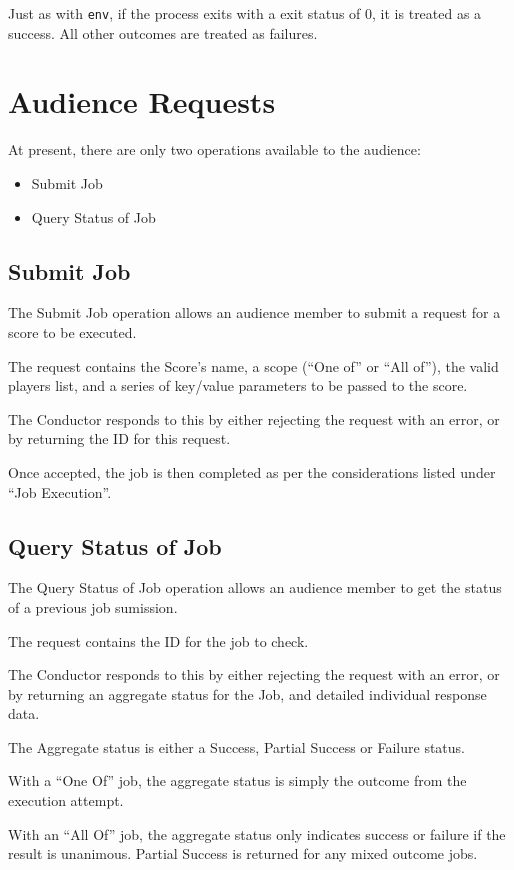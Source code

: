 \documentclass[a4paper]{article}
\begin{document}
Just as with {\tt env}, if the process exits with a exit status of 0,
it is treated as a success.  All other outcomes are treated as
failures.

\section{Audience Requests}

At present, there are only two operations available to the audience:

\begin{itemize}
\item Submit Job
\item Query Status of Job
\end{itemize}

\subsection{Submit Job}

The Submit Job operation allows an audience member to submit a request
for a score to be executed.

The request contains the Score's name, a scope (``One of'' or ``All
of''), the valid players list, and a series of key/value parameters to
be passed to the score.

The Conductor responds to this by either rejecting the request with an
error, or by returning the ID for this request.

Once accepted, the job is then completed as per the considerations
listed under ``Job Execution''.

\subsection{Query Status of Job}

The Query Status of Job operation allows an audience member to get the
status of a previous job sumission.

The request contains the ID for the job to check.

The Conductor responds to this by either rejecting the request with an
error, or by returning an aggregate status for the Job, and detailed
individual response data.

The Aggregate status is either a Success, Partial Success or Failure
status.

With a ``One Of'' job, the aggregate status is simply the outcome from
the execution attempt.

With an ``All Of'' job, the aggregate status only indicates success or
failure if the result is unanimous.  Partial Success is returned for
any mixed outcome jobs.
\end{document}
